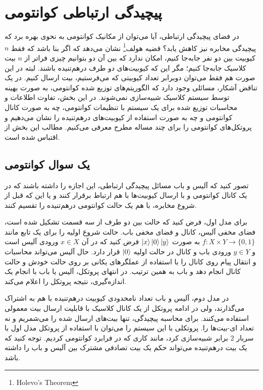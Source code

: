 \chapter{پیچیدگی ارتباطی کوانتومی}
در فضای پیچیدگی ارتباطی، آیا می‌توان از مکانیک کوانتومی به نحوی بهره برد که پیچیدگی مخابره نیز کاهش یابد؟ قضیه هولف\footnote{Holevo's Theorem} نشان می‌دهد که اگر بنا باشد که فقط $n$ کیوبیت بین دو نفر جابه‌جا کنیم، امکان ندارد که بین آن دو بتوانیم چیزی فراتر از $n$ بیت کلاسیک جا‌به‌جا کنیم؛ مگر این که کیوبیت‌های دو طرف درهم‌تنیده باشند. 
\cite{holevo73}
لبته در این صورت هم فقط می‌توان دوبرابر تعداد کیوبیتی که می‌فرستیم، بیت ارسال کنیم. در یک تناقض آشکار، مسائلی وجود دارد که الگوریتم‌های توزیع شده کوانتومی، به صورت بهینه توسط سیستم کلاسیک شبیه‌سازی نمی‌شوند. در این بخش، تفاوت اطلاعات و محاسبات توزیع شده برای یک سیستم با تنظیمات کوانتومی، چه به صورت کانال کوانتومی و چه به صورت استفاده از کیوبیت‌های درهم‌تنیده را نشان ‌می‌دهیم و پروتکل‌های کوانتومی را برای چند مساله مطرح معرفی می‌‌کنیم. 
مطالب این بخش از
 \cite{wolf19, Gilles01} اقتباس شده است. 
\section{یک سوال کوانتومی}
تصور کنید که آلیس و باب مسائل پیچیدگی ارتباطی، این اجازه را داشته باشند که در یک کانال کوانتومی و با ارسال کیوبیت‌ها با هم ارتباط برقرار کنند و یا این که قبل از شروع مخابره، با هم یک حالت کوانتومی درهم‌تنیده را تقسیم کنند. 

برای مدل اول، فرض کنید که حالت بین دو طرف از سه قسمت تشکیل شده است، فضای مخفی آلیس، کانال و فضای مخفی باب. حالت شروع اولیه را برای یک تابع مانند  $f: X \times Y \to \{0,1\}$ به صورت $\ket{x}\ket{0}\ket{y}$ فرض کنید که در آن $x \in X$ ورودی آلیس است و $y \in Y$ ورودی باب و کانال در حالت اولیه $\ket{0}$ قرار دارد. حال آلیس می‌تواند محاسبات و انتقال پیام روی کانال را با استفاده از عملگرهای یکانی بر روی حالت خودش و حالت کانال انجام دهد و باب به همین ترتیب. در انتهای پروتکل، آلیس یا باب با انجام یک اندازه‌گیری، نتیجه پروتکل را اعلام می‌کند.  \cite{yao93} 

در مدل دوم، آلیس و باب تعداد نامحدودی کیوبیت درهم‌تنیده با هم به اشتراک می‌گذارند، ولی در ادامه پروتکل از یک کانال کلاسیک با قابلیت ارسال بیت معمولی استفاده می‌کنند. برای محاسبه پیچیدگی، تنها بیت‌های ارسال شده را می‌شمریم و نه تعداد ای-بیت‌ها را. پروتکلی با این سیستم را می‌توان با استفاده از پروتکل مدل اول با سربار $2$ برابر شبیه‌سازی کرد، مانند کاری که در فرابرد کوانتومی کردیم. توجه کنید که یک بیت درهم‌تنیده می‌تواند حکم یک بیت تصادفی مشترک بین آلیس و باب را داشته باشد. 
\cite{cleve97}

